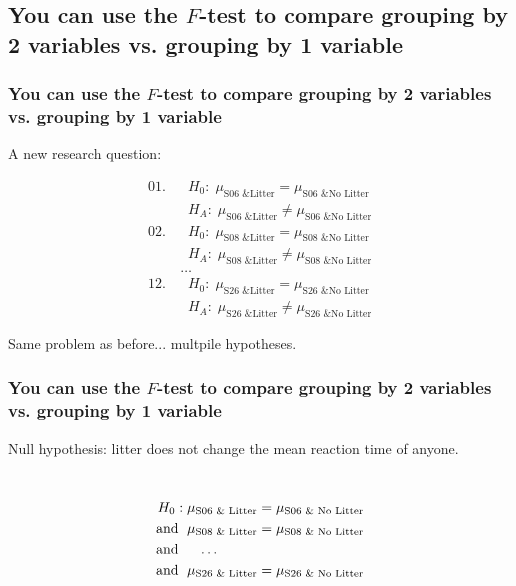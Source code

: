 \documentclass[slidestop,compress,mathserif,12pt,t,professionalfonts,xcolor=table]{beamer}
\newcommand{\mainideaA}{You can use the $F$-test to compare grouping by 2 variables vs. grouping by 1 variable}
\begin{document}

\subsection{\mainideaA}

\begin{frame}
  \frametitle{\mainideaA}

A new research question:


{\small
\begin{align*}
01.\ &  \; \; H_0: \; \mu_{\text{S06 \& Litter}} = \mu_{\text{S06 \& No Litter}} \\
     &  \; \; H_A: \; \mu_{\text{S06 \& Litter}} \neq \mu_{\text{S06 \& No Litter}} \\
02.\ &  \; \; H_0: \; \mu_{\text{S08 \& Litter}} = \mu_{\text{S08 \& No Litter}} \\
     &  \; \; H_A: \; \mu_{\text{S08 \& Litter}} \neq \mu_{\text{S08 \& No Litter}} \\
     & \ldots \\
12.\ &  \; \; H_0: \; \mu_{\text{S26 \& Litter}} = \mu_{\text{S26 \& No Litter}} \\
     &  \; \; H_A: \; \mu_{\text{S26 \& Litter}} \neq \mu_{\text{S26 \& No Litter}} 
\end{align*}
}

Same problem as before... multpile hypotheses.

\end{frame}


\begin{frame}
  \frametitle{\mainideaA}

Null hypothesis: litter does not change the mean reaction time of anyone.

\hspace \\


{\small
\begin{align*}
H_0: \; & \mu_{\text{S06 \& Litter}} = \mu_{\text{S06 \& No Litter}} \\
\textmd{and } \; & \mu_{\text{S08 \& Litter}} = \mu_{\text{S08 \& No Litter}} \\
\textmd{and } \; & \; \; \; \ldots \\
\textmd{and } \; & \mu_{\text{S26 \& Litter}} = \mu_{\text{S26 \& No Litter}} \\
\end{align*}
}

\end{frame}
\end{document}
